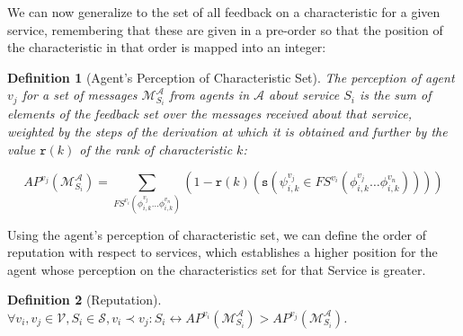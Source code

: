 \documentclass[compsoc, conference, letterpaper, 10pt, times]{IEEEtran}
\newtheorem{definition}{Definition}
\begin{document}
We can now generalize to the set of all feedback on a characteristic for a given service, remembering that these are given in a pre-order so that the position of the characteristic in that order is mapped into an integer:


\begin{definition}[Agent's Perception of Characteristic Set]
The perception of agent $v_{j}$ for a set of messages $\mathcal{M}^{\mathcal{A}}_{S_{i}}$ from agents in $\mathcal{A}$ about service $S_{i}$ 
is the sum of elements of the feedback set over the messages received about that service, weighted by the steps of the derivation at which it is obtained and further by the value $\mathtt{r}(k)$ of the rank of characteristic $k$: 

\[
AP^{v_{j}}(\mathcal{M}^{\mathcal{A}}_{S_{i}})=\sum_{FS^{v_{i}}(\phi^{v_{j}}_{i,k}\dots \phi^{v_{n}}_{i,k})}
(1-\mathtt{r}(k)
(\mathtt{s}(\psi^{v_{j}}_{i,k} \in FS^{v_{i}}(\phi^{v_{j}}_{i,k}\dots \phi^{v_{n}}_{i,k}))))
\]

\end{definition}


Using the agent's perception of characteristic set, we can define the order of reputation with respect to services, which establishes a higher position for the agent whose perception on the characteristics set for that Service is greater.

\begin{definition}[Reputation]
$\forall v_{i}, v_{j}\in \mathcal{V}, S_{i}\in \mathcal{S}, v_{i}\prec v_{j}:{S_{i}} \leftrightarrow AP^{v_{i}}(\mathcal{M}^{\mathcal{A}}_{S_{i}})>AP^{v_{j}}(\mathcal{M}^{\mathcal{A}}_{S_{i}})$.
\end{definition}
\end{document}
